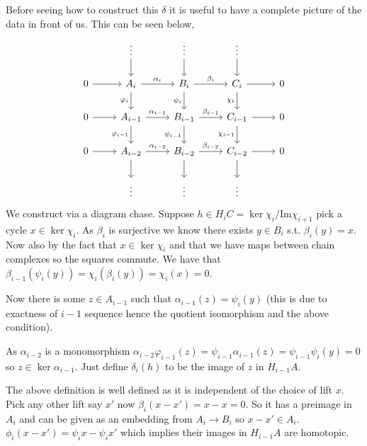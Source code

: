 \documentclass[12pt]{article}
\numberwithin{equation}{section}
\newcommand{\image}{{\mathrm{Im}}}
\begin{document}
	Before seeing how to construct this $\delta $ it is useful to have a complete picture of the data in front of us. This can be seen below,
	\[\begin{tikzcd}
		& \vdots & \vdots & \vdots \\
		0 & {A_i} & {B_i} & {C_i} & 0 \\
		0 & {A_{i-1}} & {B_{i-1}} & {C_{i-1}} & 0 \\
		0 & {A_{i-2}} & {B_{i-2}} & {C_{i-2}} & 0 \\
		& \vdots & \vdots & \vdots
		\arrow[from=2-1, to=2-2]
		\arrow["{\alpha_i}", from=2-2, to=2-3]
		\arrow["{\beta_i}", from=2-3, to=2-4]
		\arrow[from=2-4, to=2-5]
		\arrow[from=3-1, to=3-2]
		\arrow[from=4-1, to=4-2]
		\arrow["{\alpha_{i-1}}", from=3-2, to=3-3]
		\arrow["{\beta_{i-1}}", from=3-3, to=3-4]
		\arrow[from=3-4, to=3-5]
		\arrow["{\alpha_{i-2}}", from=4-2, to=4-3]
		\arrow["{\beta_{i-2}}", from=4-3, to=4-4]
		\arrow[from=4-4, to=4-5]
		\arrow["{\varphi_i}"', from=2-2, to=3-2]
		\arrow["{\varphi_{i-1}}"', from=3-2, to=4-2]
		\arrow[from=4-2, to=5-2]
		\arrow[from=1-2, to=2-2]
		\arrow[from=1-3, to=2-3]
		\arrow[from=1-4, to=2-4]
		\arrow["{\psi_i}"', from=2-3, to=3-3]
		\arrow["{\chi_i}"', from=2-4, to=3-4]
		\arrow["{\psi_{i-1}}"', from=3-3, to=4-3]
		\arrow["{\chi_{i-1}}"', from=3-4, to=4-4]
		\arrow[from=4-3, to=5-3]
		\arrow[from=4-4, to=5-4]
	\end{tikzcd}\]
	We construct via a diagram chase. Suppose $h \in H_i C= \ker \chi_i / \image \chi_{i+1} $ pick a cycle $x\in \ker \chi_i$. As $\beta_i $ is surjective we know there exists $y \in B_i$ s.t. $\beta_i(y)=x $. Now also by the fact that $x\in \ker \chi_i$ and that we have maps between chain complexes so the squares commute. We have that $\beta_{i-1}(\psi_{i}(y))=\chi_i(\beta_i(y))=\chi_i(x)=0$.
	
	Now there is some $z \in A_{i-1}$ such that $\alpha_{i-1}(z)=\psi_i(y)$ (this is due to exactness of $i-1$ sequence hence the quotient isomorphism and the above condition).
	
	As $\alpha_{i-2}$ is a monomorphism $\alpha_{i-2} \varphi_{i-1}(z)=\psi_{i-1}\alpha_{i-1}(z)=\psi_{i-1}\psi_{i}(y)=0$ so $z\in \ker \alpha_{i-1}$. Just define $\delta_i(h) $ to be the image of $z$ in $H_{i-1}A$.
	
	The above definition is well defined as it is independent of the choice of lift $x$. Pick any other lift say $x'$ now $\beta_i(x-x')=x-x=0$. So it has a preimage in $A_i$ and can be given as an embedding from $A_i \to B_i$ so $x-x' \in A_i$. $\phi_i(x-x')=\psi_i x - \psi_i x'$ which implies their images in $H_{i-1}A$ are homotopic.
	
\end{document}
